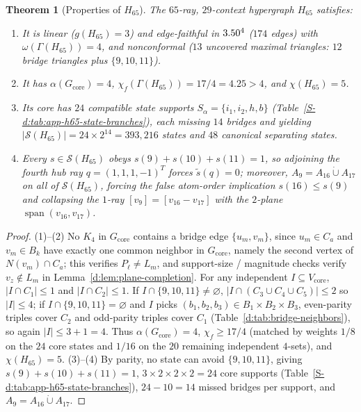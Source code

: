 \documentclass[aps,pra,reprint,superscriptaddress,longbibliography,nofootinbib,floatfix,10pt]{revtex4-2}
\newtheorem{theorem}{Theorem}
\theoremstyle{definition}\newtheorem{definition}[theorem]{Definition}
\theoremstyle{remark}\newtheorem{remark}[theorem]{Remark}
\newcommand{\Sc}{\mathcal S}\newcommand{\Cc}{\mathcal C}
\DeclareMathOperator{\spanop}{span}\DeclareMathOperator{\rank}{rank}
\begin{document}
\begin{theorem}[Properties of $H_{65}$]\label{d:thm:h65}
The $65$-ray, $29$-context hypergraph $H_{65}$ satisfies:
\begin{enumerate}
\item It is linear ($g(H_{65})=3$) and edge-faithful in $3.50^4$ ($174$ edges) with $\omega(\Gamma(H_{65}))=4$, and nonconformal ($13$ uncovered maximal triangles: $12$ bridge triangles plus $\{9,10,11\}$).
\item It has $\alpha(G_{\mathrm{core}})=4$, $\chi_f(\Gamma(H_{65}))=17/4=4.25>4$, and $\chi(H_{65})=5$.
\item Its core has $24$ compatible state supports $S_\alpha=\{i_1,i_2,h,b\}$ (Table~\ref{S-d:tab:app-h65-state-branches}), each missing $14$ bridges and yielding $|\Sc(H_{65})|=24\times 2^{14}=393{,}216$ states and $48$ canonical separating states.
\item Every $s\in\Sc(H_{65})$ obeys $s(9)+s(10)+s(11)=1$, so adjoining the fourth hub ray $q=(1,1,1,-1)^T$ forces $\widetilde s(q)=0$; moreover, $A_9=A_{16}\dot\cup A_{17}$ on all of $\Sc(H_{65})$, forcing the false atom-order implication $s(16)\le s(9)$ and collapsing the $1$-ray $[v_9]=[v_{16}-v_{17}]$ with the $2$-plane $\spanop(v_{16},v_{17})$.
\end{enumerate}
\end{theorem}
\begin{proof}
(1)--(2) No $K_4$ in $G_{\mathrm{core}}$ contains a bridge edge $\{u_m,v_m\}$, since $u_m\in C_a$ and $v_m\in B_k$ have exactly one common neighbor in $G_{\mathrm{core}}$, namely the second vertex of $N(v_m)\cap C_a$; this verifies $P_\ell\ne L_m$, and support-size / magnitude checks verify $v_z\notin L_m$ in Lemma~\ref{d:lem:plane-completion}. For any independent $I\subseteq V_{\mathrm{core}}$, $|I\cap C_1|\le1$ and $|I\cap C_2|\le1$. If $I\cap\{9,10,11\}\ne\varnothing$, $|I\cap(C_3\cup C_4\cup C_5)|\le2$ so $|I|\le4$; if $I\cap\{9,10,11\}=\varnothing$ and $I$ picks $(b_1,b_2,b_3)\in B_1\times B_2\times B_3$, even-parity triples cover $C_2$ and odd-parity triples cover $C_1$ (Table~\ref{d:tab:bridge-neighbors}), so again $|I|\le 3+1=4$. Thus $\alpha(G_{\mathrm{core}})=4$, $\chi_f\ge 17/4$ (matched by weights $1/8$ on the $24$ core states and $1/16$ on the $20$ remaining independent $4$-sets), and $\chi(H_{65})=5$. (3)--(4) By parity, no state can avoid $\{9,10,11\}$, giving $s(9)+s(10)+s(11)=1$, $3\times2\times2\times2=24$ core supports (Table~\ref{S-d:tab:app-h65-state-branches}), $24-10=14$ missed bridges per support, and $A_9=A_{16}\dot\cup A_{17}$.
\end{proof}
\end{document}
